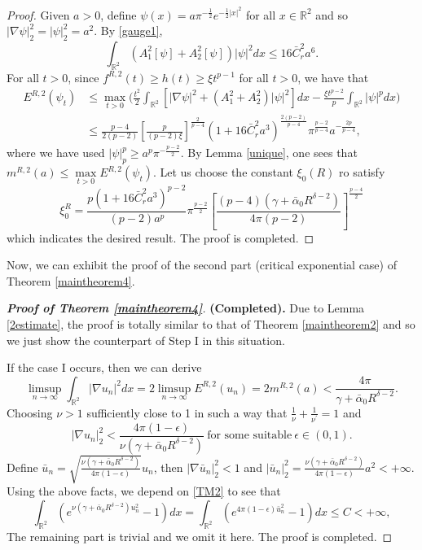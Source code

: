 \documentclass[11pt]{amsart}
\numberwithin{equation}{section}
\theoremstyle{definition}
\newcommand{\R}{\mathbb{R}}
\begin{document}
\begin{proof}
Given $a>0$, define $\psi(x)=a \pi^{-\frac12}e^{-\frac12|x|^2}$
for all $x\in\R^2$
and  so $|\nabla \psi|_2^2=|\psi|_2^2=a^2$. By \eqref{gauge1},
\[
\int_{\R^2}  (A_1^2[\psi]+A_2^2[\psi])|\psi|^2 dx\leq 16\bar{C}_r^2a^6.
\]
For all $t>0$, since $f^{R,2}(t)\geq h(t)\geq \xi t^{p-1}$ for all $t>0$, we have that
\begin{align*}
E^{R,2}(\psi_t) &
\leq \max_{t>0}\bigg(\frac{t^2}{2}\int_{\R^2}[|\nabla \psi|^2 + (A_1^2+A_2^2)|\psi|^2]dx-\frac{\xi t^{p-2}}{p}
\int_{\R^2}|\psi|^pdx\bigg)\\
&\leq \frac{p-4}{2(p-2)}\left[\frac{p}{(p-2)\xi}\right]^{\frac2{p-4}}(1+16\bar{C}_r^2a^3)^{\frac{2(p-2)}{p-4}}
\pi^{\frac{p-2}{p-4}}a^{-\frac{2p}{p-4}},
\end{align*}
where we have used $|\psi|_p^p\geq a^p\pi^{-\frac{p-2}{2}}$.
By Lemma \ref{unique}, one sees that $m^{R,2}(a)\leq \max\limits_{t>0}E^{R,2}(\psi_t)$.
Let us choose the constant $\xi_0(R)$ ro satisfy
\[
\xi_0^R=
\frac{p(1+16\bar{C}_r^2a^3)^{ p-2 }}{(p-2)a^{p}}
\pi^{\frac{p-2}{2}}
\left[\frac{(p-4)(\gamma +\bar{\alpha}_0R^{\delta-2})}{4\pi(p-2)}\right]^{\frac{p-4}2}
\]
which indicates the desired result. The proof is completed.
\end{proof}


Now, we can exhibit the proof of the second part (critical exponential case) of Theorem \ref{maintheorem4}.

\begin{proof}[\textbf{\emph{Proof of Theorem \ref{maintheorem4}}}]
\textbf{(Completed).}
Due to Lemma \ref{2estimate}, the proof is totally similar to that of Theorem \ref{maintheorem2} and
so we just show the counterpart of Step I in this situation.

If the case I occurs, then we can derive
\[
\limsup_{n\to\infty}\int_{\R^2}|\nabla u_n|^2dx=2\limsup_{n\to\infty}E^{R,2}(u_n)=2m^{R,2}
(a)<\frac{4\pi}{\gamma +\bar{\alpha}_0R^{\delta-2}}.
\]
Choosing $\nu>1$ sufficiently close to 1 in such
a way that $\frac1\nu+\frac1{\nu^\prime}=1$ and
\[
 |\nabla u_n|_2^2  <\frac{4\pi(1-\epsilon)}{\nu(\gamma +\bar{\alpha}_0R^{\delta-2})}~\text{for some suitable}~\epsilon\in(0,1).
\]
Define $\bar{u}_n=\sqrt{\frac{\nu(\gamma +\bar{\alpha}_0R^{\delta-2})}{4\pi(1-\epsilon)}}u_n$, then $|\nabla \bar{u}_n|_2^2<1$ and $|\bar{u}_n|_2^2
=\frac{\nu(\gamma +\bar{\alpha}_0R^{\delta-2})}{4\pi(1-\epsilon)}a^2<+\infty$. Using the above facts,
we depend on \eqref{TM2} to see that
\[
\int_{\R^2} (e^{ \nu(\gamma +\bar{\alpha}_0R^{\delta-2}) u_n^2}-1) dx
=\int_{\R^2} (e^{ 4\pi (1-\epsilon)\bar{u}_n^2}-1) dx\leq C<+\infty,
\]
The remaining part is trivial and we omit it here. The proof is completed.
\end{proof}
\end{document}
